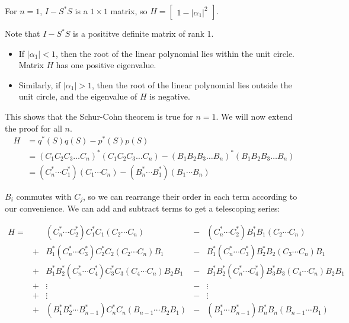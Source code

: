 \documentclass[twofold]{article}
\newcommand*\adj[1]{#1^*}
\newcommand*\abs[1]{\left \vert #1 \right\vert}
\theoremstyle{plain}
\theoremstyle{definition}
\theoremstyle{remark}
\begin{document}
For \(n = 1\), \(I - \adj{S}S\) is a \(1 \times 1\) matrix, so \(H = \begin{bmatrix} 1 - \abs{\alpha_1}^2 \end{bmatrix}\). 



Note that \(I - \adj{S} S\) is a posititve definite matrix of rank 1. 
\begin{itemize}
\item If \(\abs{\alpha_1} < 1\), then the root of the linear polynomial lies within the unit circle. Matrix \(H\) has one positive eigenvalue.
\item Similarly, if \(\abs{\alpha_1} > 1\), then the root of the linear polynomial lies outside the unit circle, and the eigenvalue of \(H\) is negative. \end{itemize}

 This shows that the Schur-Cohn theorem is true for \(n = 1\). We will now extend the proof for all \(n\).
\begin{equation*} \begin{split}
H & =  \adj{q}(S) q(S) - \adj{p}(S) p(S) \\
&= \adj{(C_1C_2C_3 \ldots C_n)}(C_1C_2C_3\ldots C_n) - \adj{(B_1B_2B_3\ldots B_n)} (B_1B_2B_3\ldots B_n) \\
& = (\adj{C_n} \cdots \adj{C_1})( C_1 \cdots C_n) - (\adj{B_n} \cdots \adj{B_1}) (B_1 \cdots B_n) 
\end{split} \end{equation*}

\(B_i\) commutes with \(C_j\), so we can rearrange their order in each term according to our convenience. 
We can add and subtract terms to get a telescoping series:

\[\begin{array}{ccccc}
H = &   & (\adj{C_n} \cdots \adj{C_2}) \adj{C_1} C_1 ( C_2 \cdots C_n) & - & (\adj{C_n} \cdots \adj{C_2}) \adj{B_1} B_1 (C_2 \cdots C_n) \\
& + & \adj{B_1} (\adj{C_n} \cdots \adj{C_3}) \adj{C_2} C_2( C_2 \cdots C_n) B_1 & -& \adj{B_1}(\adj{C_n} \cdots \adj{C_3}) \adj{B_2} B_2(C_3 \cdots C_n) B_1 \\
&    + & \adj{B_1} \adj{B_2} (\adj{C_n} \cdots \adj{C_4})\adj{C_3} C_3( C_4 \cdots C_n) B_2 B_1& -& \adj{B_1} \adj{B_2}(\adj{C_n} \cdots \adj{C_4})\adj{B_3} B_3 (C_4 \cdots C_n) B_2 B_1 \\
& + & \vdots & -& \vdots  \\
& + & \vdots & -& \vdots  \\
& + & (\adj{B_1} \adj{B_2} \cdots \adj{B_{n-1}}) \adj{C_n} C_n  (B_{n-1} \cdots  B_2 B_1) & -& (\adj{B_1} \cdots \adj{B_{n-1}})\adj{B_n} B_n (B_{n-1} \cdots B_1) \\
\end{array}\]
\end{document}
